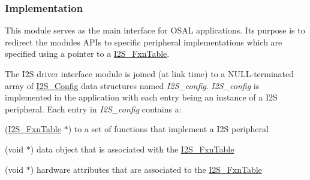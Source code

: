 \subsubsection*{Implementation}

This module serves as the main interface for O\+S\+A\+L applications. Its purpose is to redirect the module\textquotesingle{}s A\+P\+Is to specific peripheral implementations which are specified using a pointer to a \hyperlink{struct_i2_s___fxn_table}{I2\+S\+\_\+\+Fxn\+Table}.

The I2\+S driver interface module is joined (at link time) to a N\+U\+L\+L-\/terminated array of \hyperlink{struct_i2_s___config}{I2\+S\+\_\+\+Config} data structures named {\itshape I2\+S\+\_\+config}. {\itshape I2\+S\+\_\+config} is implemented in the application with each entry being an instance of a I2\+S peripheral. Each entry in {\itshape I2\+S\+\_\+config} contains a\+:
\begin{DoxyItemize}
\item (\hyperlink{struct_i2_s___fxn_table}{I2\+S\+\_\+\+Fxn\+Table} $\ast$) to a set of functions that implement a I2\+S peripheral
\item (void $\ast$) data object that is associated with the \hyperlink{struct_i2_s___fxn_table}{I2\+S\+\_\+\+Fxn\+Table}
\item (void $\ast$) hardware attributes that are associated to the \hyperlink{struct_i2_s___fxn_table}{I2\+S\+\_\+\+Fxn\+Table}
\end{DoxyItemize}

